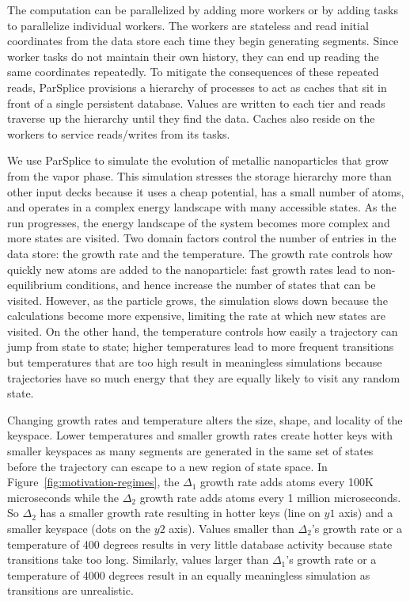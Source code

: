 The computation can be parallelized by adding more workers or by adding tasks
to parallelize individual workers.  The workers are stateless and read initial
coordinates from the data store each time they begin generating segments. Since
worker tasks do not maintain their own history, they can end up reading the
same coordinates repeatedly. To mitigate the consequences of these repeated
reads, ParSplice provisions a hierarchy of processes to act as caches that sit
in front of a single persistent database.  Values are written to each tier and
reads traverse up the hierarchy until they find the data.  Caches also reside
on the workers to service reads/writes from its tasks.  

We use ParSplice to simulate the evolution of metallic nanoparticles that grow
from the vapor phase.  This simulation stresses the storage hierarchy more than
other input decks because it uses a cheap potential, has a small number of
atoms, and operates in a complex energy landscape with many accessible states.
As the run progresses, the energy landscape of the system becomes more complex
and more states are visited.  Two domain factors control the number of entries
in the data store: the growth rate and the temperature. The growth rate
controls how quickly new atoms are added to the nanoparticle: fast growth rates
lead to non-equilibrium conditions, and hence increase the number of states
that can be visited.  However, as the particle grows, the simulation slows down
because the calculations become more expensive, limiting the rate at which new
states are visited.  On the other hand, the temperature controls how easily a
trajectory can jump from state to state; higher temperatures lead to more
frequent transitions but temperatures that are too high result in meaningless
simulations because trajectories have so much energy that they are equally
likely to visit any random state. 

Changing growth rates and temperature alters the size, shape, and locality of
the keyspace. Lower temperatures and smaller growth rates create
hotter keys with smaller keyspaces as many segments are generated in the same
set of states before the trajectory can escape to a new region of state space.
In Figure~\ref{fig:motivation-regimes}, the \(\Delta_1\) growth rate adds atoms
every 100K microseconds while the \(\Delta_2\) growth rate adds atoms every 1
million microseconds. So \(\Delta_2\) has a smaller growth rate resulting in
hotter keys (line on \(y1\) axis) and a smaller keyspace (dots on the \(y2\)
axis).  Values smaller than \(\Delta_2\)'s growth rate or a temperature of 400
degrees results in very little database activity because state transitions take
too long. Similarly, values larger than \(\Delta_1\)'s growth rate or a
temperature of 4000 degrees result in an equally meaningless simulation as
transitions are unrealistic.

